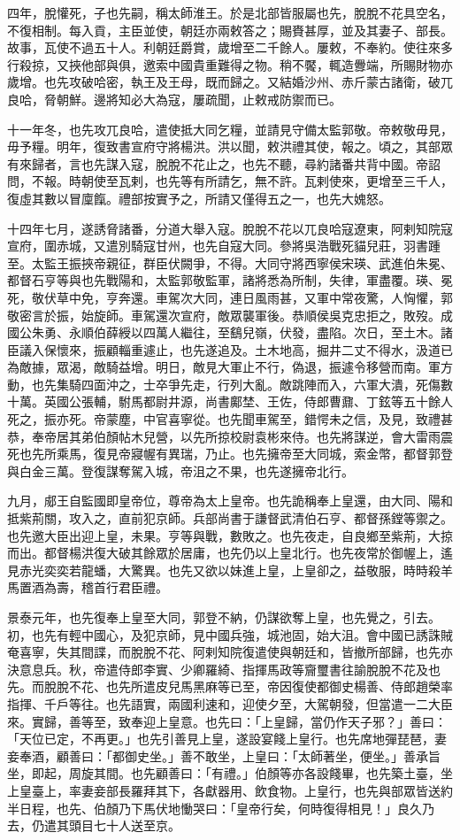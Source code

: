 \begin{pinyinscope}
四年，脫懽死，子也先嗣，稱太師淮王。於是北部皆服屬也先，脫脫不花具空名，不復相制。每入貢，主臣並使，朝廷亦兩敕答之；賜賚甚厚，並及其妻子、部長。故事，瓦使不過五十人。利朝廷爵賞，歲增至二千餘人。屢敕，不奉約。使往來多行殺掠，又挾他部與俱，邀索中國貴重難得之物。稍不饜，輒造釁端，所賜財物亦歲增。也先攻破哈密，執王及王母，既而歸之。又結婚沙州、赤斤蒙古諸衛，破兀良哈，脅朝鮮。邊將知必大為寇，屢疏聞，止敕戒防禦而已。

十一年冬，也先攻兀良哈，遣使抵大同乞糧，並請見守備太監郭敬。帝敕敬毋見，毋予糧。明年，復致書宣府守將楊洪。洪以聞，敕洪禮其使，報之。頃之，其部眾有來歸者，言也先謀入寇，脫脫不花止之，也先不聽，尋約諸番共背中國。帝詔問，不報。時朝使至瓦剌，也先等有所請乞，無不許。瓦剌使來，更增至三千人，復虛其數以冒廩餼。禮部按實予之，所請又僅得五之一，也先大媿怒。

十四年七月，遂誘脅諸番，分道大舉入寇。脫脫不花以兀良哈寇遼東，阿剌知院寇宣府，圍赤城，又遣別騎寇甘州，也先自寇大同。參將吳浩戰死貓兒莊，羽書踵至。太監王振挾帝親征，群臣伏闕爭，不得。大同守將西寧侯宋瑛、武進伯朱冕、都督石亨等與也先戰陽和，太監郭敬監軍，諸將悉為所制，失律，軍盡覆。瑛、冕死，敬伏草中免，亨奔還。車駕次大同，連日風雨甚，又軍中常夜驚，人恟懼，郭敬密言於振，始旋師。車駕還次宣府，敵眾襲軍後。恭順侯吳克忠拒之，敗歿。成國公朱勇、永順伯薛綬以四萬人繼往，至鷂兒嶺，伏發，盡陷。次日，至土木。諸臣議入保懷來，振顧輜重遽止，也先遂追及。土木地高，掘井二丈不得水，汲道已為敵據，眾渴，敵騎益增。明日，敵見大軍止不行，偽退，振遽令移營而南。軍方動，也先集騎四面沖之，士卒爭先走，行列大亂。敵跳陣而入，六軍大潰，死傷數十萬。英國公張輔，駙馬都尉井源，尚書鄺埜、王佐，侍郎曹鼐、丁鉉等五十餘人死之，振亦死。帝蒙塵，中官喜寧從。也先聞車駕至，錯愕未之信，及見，致禮甚恭，奉帝居其弟伯顏帖木兒營，以先所掠校尉袁彬來侍。也先將謀逆，會大雷雨震死也先所乘馬，復見帝寢幄有異瑞，乃止。也先擁帝至大同城，索金幣，都督郭登與白金三萬。登復謀奪駕入城，帝沮之不果，也先遂擁帝北行。

九月，郕王自監國即皇帝位，尊帝為太上皇帝。也先詭稱奉上皇還，由大同、陽和抵紫荊關，攻入之，直前犯京師。兵部尚書于謙督武清伯石亨、都督孫鏜等禦之。也先邀大臣出迎上皇，未果。亨等與戰，數敗之。也先夜走，自良鄉至紫荊，大掠而出。都督楊洪復大破其餘眾於居庸，也先仍以上皇北行。也先夜常於御幄上，遙見赤光奕奕若龍蟠，大驚異。也先又欲以妹進上皇，上皇卻之，益敬服，時時殺羊馬置酒為壽，稽首行君臣禮。

景泰元年，也先復奉上皇至大同，郭登不納，仍謀欲奪上皇，也先覺之，引去。初，也先有輕中國心，及犯京師，見中國兵強，城池固，始大沮。會中國已誘誅賊奄喜寧，失其間諜，而脫脫不花、阿剌知院復遣使與朝廷和，皆撤所部歸，也先亦決意息兵。秋，帝遣侍郎李實、少卿羅綺、指揮馬政等齎璽書往諭脫脫不花及也先。而脫脫不花、也先所遣皮兒馬黑麻等已至，帝因復使都御史楊善、侍郎趙榮率指揮、千戶等往。也先語實，兩國利速和，迎使夕至，大駕朝發，但當遣一二大臣來。實歸，善等至，致奉迎上皇意。也先曰：「上皇歸，當仍作天子邪？」善曰：「天位已定，不再更。」也先引善見上皇，遂設宴餞上皇行。也先席地彈琵琶，妻妾奉酒，顧善曰：「都御史坐。」善不敢坐，上皇曰：「太師著坐，便坐。」善承旨坐，即起，周旋其間。也先顧善曰：「有禮。」伯顏等亦各設餞畢，也先築土臺，坐上皇臺上，率妻妾部長羅拜其下，各獻器用、飲食物。上皇行，也先與部眾皆送約半日程，也先、伯顏乃下馬伏地慟哭曰：「皇帝行矣，何時復得相見！」良久乃去，仍遣其頭目七十人送至京。


\end{pinyinscope}

